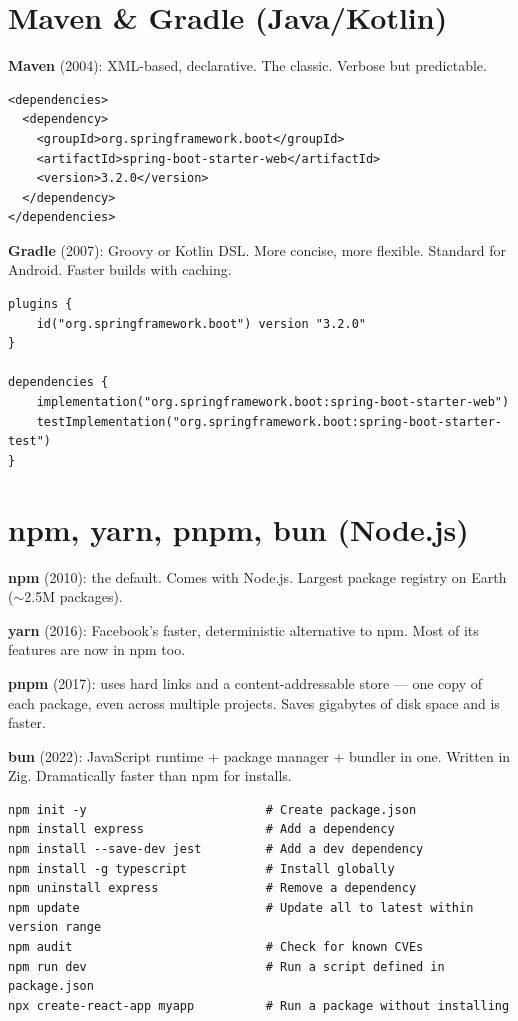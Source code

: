 \documentclass[11pt, letterpaper]{article}
\begin{document}
\section*{Maven \& Gradle (Java/Kotlin)}

\textbf{Maven} (2004): XML-based, declarative. The classic. Verbose but predictable.

\begin{lstlisting}[style=code, caption={Maven pom.xml fragment}]
<dependencies>
  <dependency>
    <groupId>org.springframework.boot</groupId>
    <artifactId>spring-boot-starter-web</artifactId>
    <version>3.2.0</version>
  </dependency>
</dependencies>
\end{lstlisting}

\textbf{Gradle} (2007): Groovy or Kotlin DSL. More concise, more flexible. Standard for Android. Faster builds with caching.

\begin{lstlisting}[style=code, caption={Gradle build.gradle.kts}]
plugins {
    id("org.springframework.boot") version "3.2.0"
}

dependencies {
    implementation("org.springframework.boot:spring-boot-starter-web")
    testImplementation("org.springframework.boot:spring-boot-starter-test")
}
\end{lstlisting}

\section*{npm, yarn, pnpm, bun (Node.js)}

\textbf{npm} (2010): the default. Comes with Node.js. Largest package registry on Earth ($\sim$2.5M packages).

\textbf{yarn} (2016): Facebook's faster, deterministic alternative to npm. Most of its features are now in npm too.

\textbf{pnpm} (2017): uses hard links and a content-addressable store --- one copy of each package, even across multiple projects. Saves gigabytes of disk space and is faster.

\textbf{bun} (2022): JavaScript runtime + package manager + bundler in one. Written in Zig. Dramatically faster than npm for installs.

\begin{lstlisting}[style=code, caption={npm common commands}]
npm init -y                         # Create package.json
npm install express                 # Add a dependency
npm install --save-dev jest         # Add a dev dependency
npm install -g typescript           # Install globally
npm uninstall express               # Remove a dependency
npm update                          # Update all to latest within version range
npm audit                           # Check for known CVEs
npm run dev                         # Run a script defined in package.json
npx create-react-app myapp          # Run a package without installing
\end{lstlisting}
\end{document}
